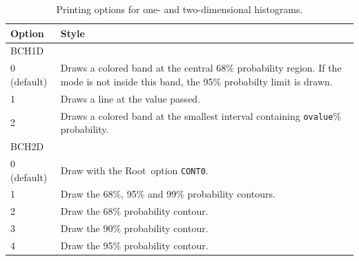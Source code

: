 \documentclass[11pt, a4paper]{article}
\newcommand{\bat}{{\sc BAT}}
\newcommand{\Root}{{\sc Root}}
\begin{document}
\begin{table}[ht!]
\begin{tabular}{ll}
\hline
Option & Style \\ 
\hline
BCH1D & \\ 
\hline 
0 (default) & \begin{minipage}[l]{12 cm}Draws a colored band at the central 68\% probability region. If the mode is not inside this band, the 95\% probabilty limit is drawn. \end{minipage}\\ 
1           & Draws a line at the value passed. \\ 
2           & Draws a colored band at the smallest interval containing \verb|ovalue|\% probability. \\
\hline 
BCH2D & \\ 
\hline 
0 (default) & Draw with the \Root\ option \verb|CONT0|. \\ 
1           & Draw the 68\%, 95\% and 99\% probability contours. \\ 
2           & Draw the 68\% probability contour. \\ 
3           & Draw the 90\% probability contour. \\ 
4           & Draw the 95\% probability contour. \\ 
\hline
\end{tabular}
\caption{Printing options for one- and two-dimensional histograms. 
\label{table:printingoptions}} 
\end{table}




%
\end{document}
